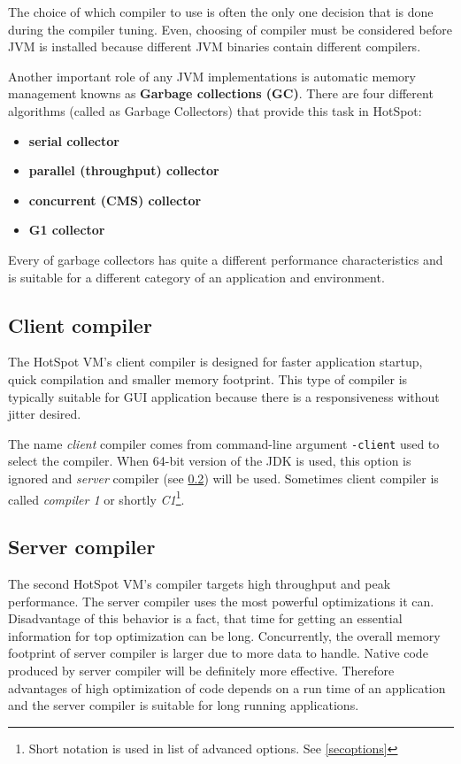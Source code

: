 \documentclass[
  digital, %
  oneside,
  notable, %
  nolof,     %
  nolot     %
]{fithesis3}
\begin{document}
The choice of which compiler to use is often the only one decision that is done during the compiler tuning. Even, choosing of compiler must be considered before JVM is installed because different JVM binaries contain different compilers. \cite{scott}

Another important role of any JVM implementations is automatic memory management knowns as \textbf{Garbage collections (GC)}. There are four different algorithms (called as Garbage Collectors) that provide this task in HotSpot:
\begin{itemize}
	\item \textbf{serial collector}
	\item \textbf{parallel (throughput) collector}
	\item \textbf{concurrent (CMS) collector}
	\item \textbf{G1 collector}
\end{itemize}
Every of garbage collectors has quite a different performance characteristics and is suitable for a different category of an application and environment. \cite{scott}

\subsection{Client compiler}\label{clientcomp}
The HotSpot VM's client compiler is designed for faster application startup, quick compilation and smaller memory footprint. This type of compiler is typically suitable for GUI application because there is a responsiveness without jitter desired. \cite{hunt}

The name \textit{client} compiler comes from command-line argument \texttt{-client} used to select the compiler. When 64-bit version of the JDK is used, this option is ignored and \textit{server} compiler (see \ref{servercomp}) will be used. Sometimes client compiler is called \textit{compiler 1} or shortly \textit{C1}\footnote{Short notation is used in list of advanced options. See \ref{secoptions}}. \cite{scott} \cite{java}
\subsection{Server compiler}\label{servercomp}
The second HotSpot VM's compiler targets high throughput and peak performance. The server compiler uses the most powerful optimizations it can. Disadvantage of this behavior is a fact, that time for getting an essential information for top optimization can be long. Concurrently, the overall memory footprint of server compiler is larger due to more data to handle. Native code produced by server compiler will be definitely more effective. Therefore advantages of high optimization of code depends on a run time of an application and the server compiler is suitable for long running applications. \cite{hunt}
\end{document}
